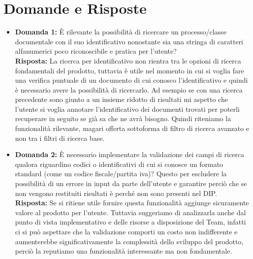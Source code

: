 \documentclass[a4paper,12pt]{article}
\begin{document}
\section{Domande e Risposte} \label{qa}
\begin{itemize}
    \item \textbf{Domanda 1:} È rilevante la possibilità di ricercare un processo/classe documentale con il suo identificativo nonostante sia una stringa di caratteri alfanumerici poco riconoscibile e pratica per l'utente? \\
    \textbf{Risposta:} La ricerca per identificativo non rientra tra le opzioni di ricerca fondamentali del prodotto, tuttavia è utile nel momento in cui si voglia fare una verifica puntuale di un documento di cui conosco l'identificativo e quindi è necessario avere la possibilità di ricercarlo. Ad esempio se con una ricerca precedente sono giunto a un insieme ridotto di risultati mi aspetto che l'utente si voglia annotare l'identificativo dei documenti trovati per poterli recuperare in seguito se già sa che ne avrà bisogno. Quindi riteniamo la funzionalità rilevante, magari offerta sottoforma di filtro di ricerca avanzato e non tra i filtri di ricerca base.
    
    \item \textbf{Domanda 2:} È necessario implementare la validazione dei campi di ricerca qualora riguardino codici o identificativi di cui si conosce un formato standard (come un codice fiscale/partita iva)? Questo per escludere la possibilità di un errore in input da parte dell'utente e garantire perciò che se non vengono restituiti risultati è perché non sono presenti nel DIP.
    \\ \textbf{Risposta:} Se si ritiene utile fornire questa funzionalità aggiunge sicuramente valore al prodotto per l'utente. Tuttavia suggeriamo di analizzarla anche dal punto di vista implementativo e delle risorse a disposizione del Team, infatti ci si può aspettare che la validazione comporti un costo non indifferente e aumenterebbe significativamente la complessità dello sviluppo del prodotto, perciò la reputiamo una funzionalità interessante ma non fondamentale.


\end{itemize}
\end{document}
